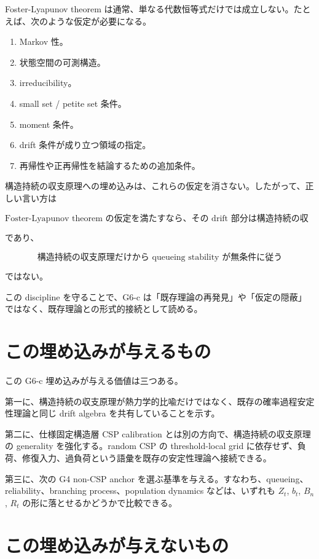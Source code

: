 \documentclass[12pt,a4paper]{article}
\begin{document}
Foster-Lyapunov theorem は通常、単なる代数恒等式だけでは成立しない。たとえば、次のような仮定が必要になる。

\begin{enumerate}
\def\labelenumi{\arabic{enumi}.}
\tightlist
\item
  Markov 性。
\item
  状態空間の可測構造。
\item
  irreducibility。
\item
  small set / petite set 条件。
\item
  moment 条件。
\item
  drift 条件が成り立つ領域の指定。
\item
  再帰性や正再帰性を結論するための追加条件。
\end{enumerate}

構造持続の収支原理への埋め込みは、これらの仮定を消さない。したがって、正しい言い方は

\[
\text{Foster-Lyapunov theorem の仮定を満たすなら、その drift 部分は構造持続の収支原理へ埋め込める}
\]

であり、

\[
\text{構造持続の収支原理だけから queueing stability が無条件に従う}
\]

ではない。

この discipline を守ることで、G6-c は「既存理論の再発見」や「仮定の隠蔽」ではなく、既存理論との形式的接続として読める。

\section{この埋め込みが与えるもの}\label{ux3053ux306eux57cbux3081ux8fbcux307fux304cux4e0eux3048ux308bux3082ux306e}

この G6-c 埋め込みが与える価値は三つある。

第一に、構造持続の収支原理が熱力学的比喩だけではなく、既存の確率過程安定性理論と同じ drift algebra を共有していることを示す。

第二に、仕様固定構造層 CSP calibration とは別の方向で、構造持続の収支原理の generality を強化する。random CSP の threshold-local grid に依存せず、負荷、修復入力、過負荷という語彙を既存の安定性理論へ接続できる。

第三に、次の G4 non-CSP anchor を選ぶ基準を与える。すなわち、queueing、reliability、branching process、population dynamics などは、いずれも \(Z_{t}\), \(b_{t}\), \(B_{n}\), \(R_{t}\) の形に落とせるかどうかで比較できる。

\section{この埋め込みが与えないもの}\label{ux3053ux306eux57cbux3081ux8fbcux307fux304cux4e0eux3048ux306aux3044ux3082ux306e}
\end{document}
